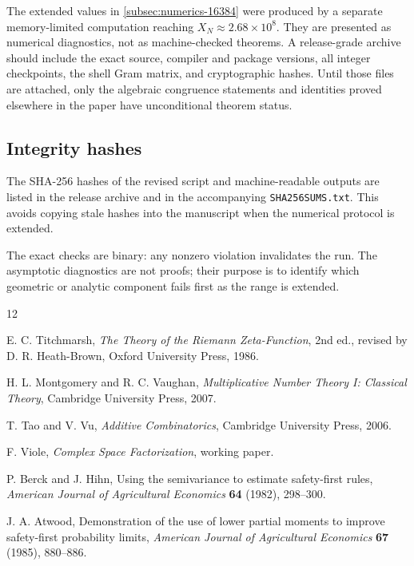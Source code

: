 The extended values in \cref{subsec:numerics-16384} were produced by a separate memory-limited computation reaching $X_N\approx2.68\times10^8$.  They are presented as numerical diagnostics, not as machine-checked theorems.  A release-grade archive should include the exact source, compiler and package versions, all integer checkpoints, the shell Gram matrix, and cryptographic hashes.  Until those files are attached, only the algebraic congruence statements and identities proved elsewhere in the paper have unconditional theorem status.

\subsection{Integrity hashes}

The SHA-256 hashes of the revised script and machine-readable outputs are listed in the release archive and in the accompanying \texttt{SHA256SUMS.txt}.  This avoids copying stale hashes into the manuscript when the numerical protocol is extended.

The exact checks are binary: any nonzero violation invalidates the run. The asymptotic diagnostics are not proofs; their purpose is to identify which geometric or analytic component fails first as the range is extended.

\begin{thebibliography}{12}

E. C. Titchmarsh,
\emph{The Theory of the Riemann Zeta-Function},
2nd ed., revised by D. R. Heath-Brown,
Oxford University Press, 1986.

H. L. Montgomery and R. C. Vaughan,
\emph{Multiplicative Number Theory I: Classical Theory},
Cambridge University Press, 2007.

T. Tao and V. Vu,
\emph{Additive Combinatorics},
Cambridge University Press, 2006.

F. Viole,
\emph{Complex Space Factorization},
working paper.

P. Berck and J. Hihn,
Using the semivariance to estimate safety-first rules,
\emph{American Journal of Agricultural Economics} \textbf{64} (1982), 298--300.

J. A. Atwood,
Demonstration of the use of lower partial moments to improve safety-first probability limits,
\emph{American Journal of Agricultural Economics} \textbf{67} (1985), 880--886.

\end{thebibliography}


